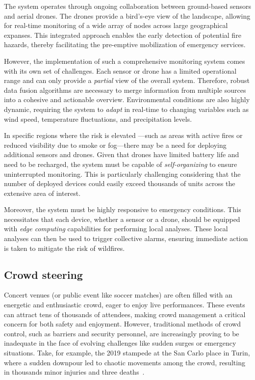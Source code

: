 The system operates through ongoing collaboration between ground-based sensors and aerial drones. 
 The drones provide a bird's-eye view of the landscape, 
 allowing for real-time monitoring of a wide array of nodes across large geographical expanses. 
 This integrated approach enables the early detection of potential fire hazards, 
 thereby facilitating the pre-emptive mobilization of emergency services.

However, the implementation of such a comprehensive monitoring system comes with its own set of challenges. 
 Each sensor or drone has a limited operational range and can only provide a \emph{partial} view of the overall system. 
 Therefore, robust data fusion algorithms are necessary to merge information from multiple sources into a cohesive and actionable overview. 
 Environmental conditions are also highly dynamic, requiring the system to \emph{adapt} in real-time to changing variables such as wind speed, temperature fluctuations, and precipitation levels.

In specific regions where the risk is elevated
 ---such as areas with active fires or reduced visibility due to smoke or fog---there may be a need for deploying additional sensors and drones. 
 Given that drones have limited battery life and need to be recharged, 
 the system must be capable of \emph{self-organizing} to ensure uninterrupted monitoring. 
 This is particularly challenging considering that the number of deployed devices could easily exceed thousands of units across the extensive area of interest.

Moreover, the system must be highly responsive to emergency conditions. 
 This necessitates that each device, whether a sensor or a drone, 
 should be equipped with \emph{edge computing} capabilities for performing local analyses. 
 These local analyses can then be used to trigger collective alarms, 
 ensuring immediate action is taken to mitigate the risk of wildfires.
\subsection{Crowd steering}
Concert venues (or public event like soccer matches) 
 are often filled with an energetic and enthusiastic crowd, 
 eager to enjoy live performances. 
 These events can attract tens of thousands of attendees, 
 making crowd management a critical concern for both safety and enjoyment. 
% 
However, traditional methods of crowd control, 
 such as barriers and security personnel, 
 are increasingly proving to be inadequate in the face of evolving challenges like sudden surges or emergency situations. 
 Take, for example, the 2019 stampede at the San Carlo place in Turin, 
 where a sudden downpour led to chaotic movements among the crowd, 
 resulting in thousands minor injuries and three deaths~\cite{enwiki:1164182872}.


